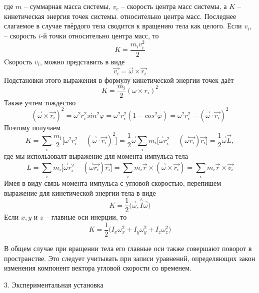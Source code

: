 \documentclass[12pt, a4paper]{article}
\begin{document}
где $m$ -- суммарная масса системы, $v_c$ -- скорость центра масс системы, а $K$ -- кинетическая энергия точек системы. относительно центра масс. Последнее слагаемое в случае твёрдого тела сводится к вращению тела как целого. Если $v_i$, -- скорость $i$-й точки относительно центра масс, то
\[K = \dfrac{m_i v_i^2}{2}\]
	Cкорость $v_i$, можно представить в виде
\[\vec{v_i} = \vec{\omega} \times \vec{r_i}\]
	Подстановки этого выражения в формулу кинетической энергии точек даёт
\[K = \dfrac{m_i}{2}(\omega \times r_i)^2\]
	Также учтем тождество 
\[(\vec{\omega} \times \vec{r_i})^2 = \omega^2 r_i^2 sin^2 \varphi = \omega^2 r_i^2 (1-cos^2\varphi) = \omega^2 r_i^2 - (\vec{\omega}\cdot\vec{r_i})^2\]
	Поэтому получаем 
\[K = \sum_i \dfrac{m_i}{2}\Big[\omega^2 r_i^2 - (\vec{\omega}\cdot\vec{r_i})^2\Big] =  \dfrac{1}{2}\vec{\omega} \sum_i m_i\Big[\vec{\omega}r_i^2 -(\vec{\omega} \vec{r_i})\vec{r_i} \Big] = \dfrac{1}{2}\vec{\omega}\vec{L},\]
где мы использовалт выражение для момента импульса тела 
\[L=\sum_i m_i\Big[\vec{\omega} r_i^2 - (\vec{\omega}\vec{r_i})\vec{r_i} \Big] = \sum_i m_i\vec{ r} \times (\vec{\omega}\times \vec{r_i}) = \sum_i m_i \vec{r} \times \vec{v_i} \]
	\hspace{0.5cm}Имея в виду связь момента импульса с угловой скоростью, перепишем выражение для кинетической энергии тела в виде
\[K=\dfrac{1}{2}\Big(\vec{\omega},\stackrel{\land}{I}\vec{\omega}\Big)\]
Если $x,y$ и $z$ -- главные оси инерции, то
\begin{equation}
	K =\dfrac{1}{2}\Big(I_x\omega_x^2+I_y\omega_y^2+I_z\omega_z^2\Big)
\end{equation}

В общем случае при вращении тела его главные оси также совершают поворот в пространстве. Это следует учитывать при записи уравнений, определяющих закон изменения компонент вектора угловой скорости со временем.

\vspace{1cm}
{\Large 3. Экспериментальная установка \\}
\end{document}
